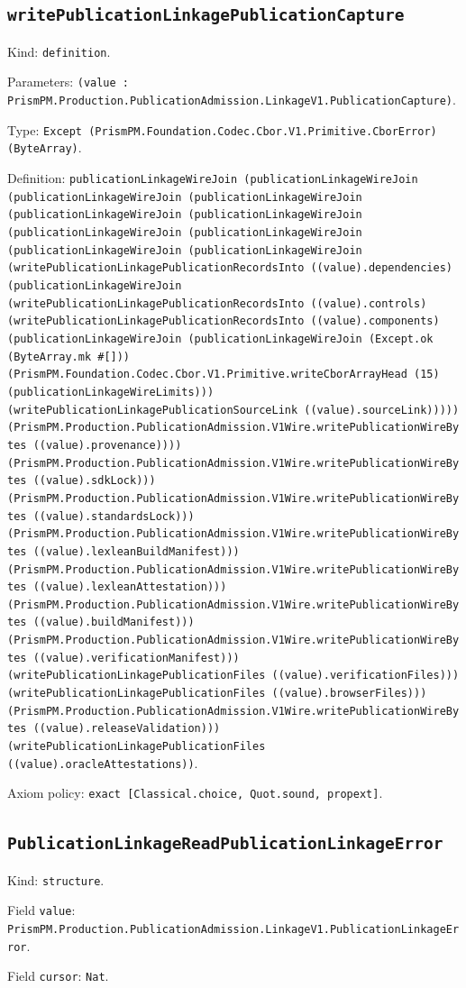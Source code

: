 \documentclass[11pt]{article}
\begin{document}
\subsection*{\texttt{writePublicationLinkagePublicationCapture}}
\noindent Kind: \texttt{definition}.\par
\noindent Parameters: \texttt{(value : PrismPM.Production.PublicationAdmission.LinkageV1.PublicationCapture)}.\par
\noindent Type: \texttt{Except (PrismPM.Foundation.Codec.Cbor.V1.Primitive.CborError) (ByteArray)}.\par
\noindent Definition: \texttt{publicationLinkageWireJoin (publicationLinkageWireJoin (publicationLinkageWireJoin (publicationLinkageWireJoin (publicationLinkageWireJoin (publicationLinkageWireJoin (publicationLinkageWireJoin (publicationLinkageWireJoin (publicationLinkageWireJoin (publicationLinkageWireJoin (writePublicationLinkagePublicationRecordsInto ((value).dependencies) (publicationLinkageWireJoin (writePublicationLinkagePublicationRecordsInto ((value).controls) (writePublicationLinkagePublicationRecordsInto ((value).components) (publicationLinkageWireJoin (publicationLinkageWireJoin (Except.ok (ByteArray.mk \#[])) (PrismPM.Foundation.Codec.Cbor.V1.Primitive.writeCborArrayHead (15) (publicationLinkageWireLimits))) (writePublicationLinkagePublicationSourceLink ((value).sourceLink))))) (PrismPM.Production.PublicationAdmission.V1Wire.writePublicationWireBytes ((value).provenance)))) (PrismPM.Production.PublicationAdmission.V1Wire.writePublicationWireBytes ((value).sdkLock))) (PrismPM.Production.PublicationAdmission.V1Wire.writePublicationWireBytes ((value).standardsLock))) (PrismPM.Production.PublicationAdmission.V1Wire.writePublicationWireBytes ((value).lexleanBuildManifest))) (PrismPM.Production.PublicationAdmission.V1Wire.writePublicationWireBytes ((value).lexleanAttestation))) (PrismPM.Production.PublicationAdmission.V1Wire.writePublicationWireBytes ((value).buildManifest))) (PrismPM.Production.PublicationAdmission.V1Wire.writePublicationWireBytes ((value).verificationManifest))) (writePublicationLinkagePublicationFiles ((value).verificationFiles))) (writePublicationLinkagePublicationFiles ((value).browserFiles))) (PrismPM.Production.PublicationAdmission.V1Wire.writePublicationWireBytes ((value).releaseValidation))) (writePublicationLinkagePublicationFiles ((value).oracleAttestations))}.\par
\noindent Axiom policy: \texttt{exact [Classical.choice, Quot.sound, propext]}.\par
\subsection*{\texttt{PublicationLinkageReadPublicationLinkageError}}
\noindent Kind: \texttt{structure}.\par
\noindent Field \texttt{value}: \texttt{PrismPM.Production.PublicationAdmission.LinkageV1.PublicationLinkageError}.\par
\noindent Field \texttt{cursor}: \texttt{Nat}.\par
\end{document}

